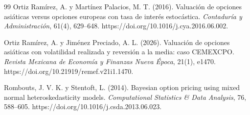 \documentclass[12pt,letterpaper]{article}
\begin{document}
\begin{thebibliography}{99}
Ortiz Ramírez, A. y Martínez Palacios, M. T. (2016). Valuación de opciones asiáticas versus opciones europeas con tasa de interés estocástica. \textit{Contaduría y Administración}, 61(4), 629--648. https://doi.org/10.1016/j.cya.2016.06.002.

Ortiz Ramírez, A. y Jiménez Preciado, A. L. (2026). Valuación de opciones asiáticas con volatilidad realizada y reversión a la media: caso CEMEXCPO. \textit{Revista Mexicana de Economía y Finanzas Nueva Época}, 21(1), e1470. https://doi.org/10.21919/remef.v21i1.1470.

Rombouts, J. V. K. y Stentoft, L. (2014). Bayesian option pricing using mixed normal heteroskedasticity models. \textit{Computational Statistics \& Data Analysis}, 76, 588--605. https://doi.org/10.1016/j.csda.2013.06.023.

\end{thebibliography}
\end{document}
